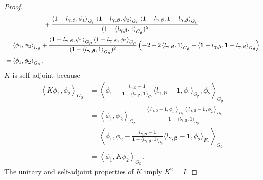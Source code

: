 \documentclass[11pt]{article}
\newcommand{\vect}[1]{\boldsymbol{#1}}
\newcommand{\inner}[1]{\left\langle #1 \right\rangle}
\begin{document}
\begin{proof}
\begin{equation*}
\begin{aligned}
& \hspace{2.2cm}+ \frac{\inner{\vect{1}-l_{\vect{\gamma},\vect{\beta}},\phi_1}_{G_{\vect{\beta}}}\inner{\vect{1}-l_{\vect{\gamma},\vect{\beta}},\phi_2}_{G_{\vect{\beta}}} \inner{\vect{1}-l_{\vect{\gamma},\vect{\beta}},\vect{1}-l_{\vect{\gamma},\vect{\beta}}}_{G_{\vect{\beta}}}}{(1-\inner{l_{\vect{\gamma},\vect{\beta}},1}_{G_{\vect{\beta}}})^2} \\ 
&= \inner{\phi_1,\phi_2}_{G_{\vect{\beta}}} + \frac{\inner{\vect{1}-l_{\vect{\gamma},\vect{\beta}},\phi_1}_{G_{\vect{\beta}}}\inner{\vect{1}-l_{\vect{\gamma},\vect{\beta}},\phi_2}_{G_{\vect{\beta}}} }{(1-\inner{l_{\vect{\gamma},\vect{\beta}},1}_{G_{\vect{\beta}}})^2} \left(- 2 + 2 \inner{l_{\vect{\gamma},\vect{\beta}},1}_{G_{\vect{\beta}}} + \inner{\vect{1}-l_{\vect{\gamma},\vect{\beta}},\vect{1}-l_{\vect{\gamma},\vect{\beta}}}_{G_{\vect{\beta}}} \right)\\ 
&= \inner{\phi_1,\phi_2}_{G_{\vect{\beta}}}. 
\end{aligned}
\end{equation*}
$K$ is self-adjoint because 
\begin{equation*}
    \begin{aligned}
\inner{K\phi_1, \phi_2}_{G_{\vect{\beta}}} &= \inner{\phi_1-\frac{l_{\vect{\gamma},\vect{\beta}}-\vect{1}}{\vect{1}-\langle l_{\vect{\gamma},\vect{\beta}}, \vect{1}\rangle_{G_{\vect{\beta}}}}\langle l_{\vect{\gamma},\vect{\beta}}-\vect{1}, \phi_1 \rangle_{G_{\vect{\beta}}},\phi_2}_{G_{\vect{\beta}}} \\ 
&= \inner{\phi_1, \phi_2}_{G_{\vect{\beta}}} - \frac{\inner{l_{\vect{\gamma},\vect{\beta}}-\vect{1},\phi_1}_{G_{\vect{\beta}}}\inner{l_{\vect{\gamma},\vect{\beta}}-\vect{1},\phi_2}_{G_{\vect{\beta}}}}{\vect{1}-\langle l_{\vect{\gamma},\vect{\beta}}, \vect{1}\rangle_{G_{\vect{\beta}}}}\\
&= \inner{\phi_1,\phi_2-\frac{l_{\vect{\gamma},\vect{\beta}}-\vect{1}}{\vect{1}-\langle l_{\vect{\gamma},\vect{\beta}}, \vect{1}\rangle_{G_{\vect{\beta}}}}\langle l_{\vect{\gamma},\vect{\beta}}-\vect{1}, \phi_2 \rangle_{F_{\vect{\gamma}}}}_{G_{\vect{\beta}}} \\ 
&= \inner{\phi_1, K\phi_2}_{G_{\vect{\beta}}}.
    \end{aligned}
\end{equation*}
The unitary and self-adjoint properties of $K$ imply $K^2=I.$
\end{proof}
\end{document}
